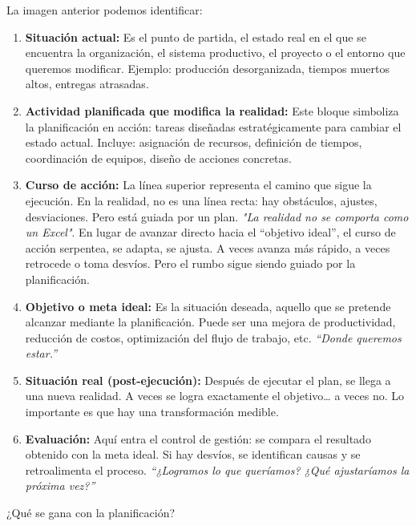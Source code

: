 \documentclass[a4paper,oneside,11pt]{article}
\begin{document}
La imagen anterior podemos identificar:

\begin{enumerate}
    \item \textbf{Situación actual:} Es el punto de partida, el estado real en el que se encuentra la organización, el sistema productivo, el proyecto o el entorno que queremos modificar. Ejemplo: producción desorganizada, tiempos muertos altos, entregas atrasadas.

    \item \textbf{Actividad planificada que modifica la realidad:} Este bloque simboliza la planificación en acción: tareas diseñadas estratégicamente para cambiar el estado actual. Incluye: asignación de recursos, definición de tiempos, coordinación de equipos, diseño de acciones concretas.

    \item \textbf{Curso de acción:} La línea superior representa el camino que sigue la ejecución. En la realidad, no es una línea recta: hay obstáculos, ajustes, desviaciones. Pero está guiada por un plan. \textit{"La realidad no se comporta como un Excel"}. En lugar de avanzar directo hacia el “objetivo ideal”, el curso de acción serpentea, se adapta, se ajusta. A veces avanza más rápido, a veces retrocede o toma desvíos. Pero el rumbo sigue siendo guiado por la planificación.

    \item \textbf{Objetivo o meta ideal:} Es la situación deseada, aquello que se pretende alcanzar mediante la planificación. Puede ser una mejora de productividad, reducción de costos, optimización del flujo de trabajo, etc. \textit{“Donde queremos estar.”}

    \item \textbf{Situación real (post-ejecución):} Después de ejecutar el plan, se llega a una nueva realidad. A veces se logra exactamente el objetivo… a veces no. Lo importante es que hay una transformación medible.

    \item \textbf{Evaluación:} Aquí entra el control de gestión: se compara el resultado obtenido con la meta ideal. Si hay desvíos, se identifican causas y se retroalimenta el proceso.\textit{ “¿Logramos lo que queríamos? ¿Qué ajustaríamos la próxima vez?”}
\end{enumerate}

¿Qué se gana con la planificación?
\end{document}
